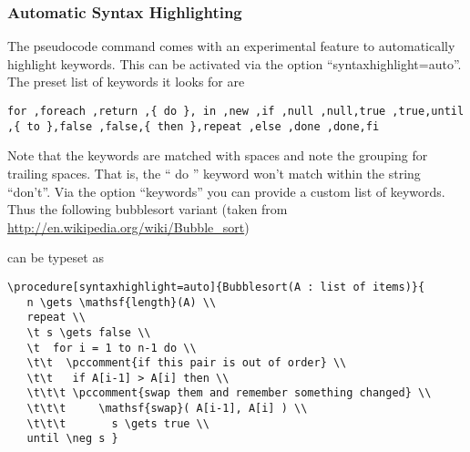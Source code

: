 \documentclass[a4paper]{report}
\begin{document}
\subsubsection{Automatic Syntax Highlighting}
The pseudocode command comes with an experimental feature to automatically highlight keywords. This can be activated via
the option \enquote{syntaxhighlight=auto}. The preset list of keywords it looks for are
\begin{lstlisting}
for ,foreach ,return ,{ do }, in ,new ,if ,null ,null,true ,true,until ,{ to },false ,false,{ then },repeat ,else ,done ,done,fi 
\end{lstlisting}
Note that the keywords are matched with spaces and note the grouping for trailing spaces. That is, the \enquote{ do } keyword won't match within the string \enquote{don't}.
Via the option \enquote{keywords} you can provide a custom list of keywords.
Thus the following bubblesort variant (taken from \url{http://en.wikipedia.org/wiki/Bubble_sort}) 
\begin{center}
\end{center}
can be typeset as
\begin{lstlisting}
\procedure[syntaxhighlight=auto]{Bubblesort(A : list of items)}{
   n \gets \mathsf{length}(A) \\
   repeat \\
   \t s \gets false \\
   \t  for i = 1 to n-1 do \\
   \t\t  \pccomment{if this pair is out of order} \\
   \t\t   if A[i-1] > A[i] then \\
   \t\t\t \pccomment{swap them and remember something changed} \\
   \t\t\t     \mathsf{swap}( A[i-1], A[i] ) \\
   \t\t\t       s \gets true \\
   until \neg s }
\end{lstlisting}
\end{document}
